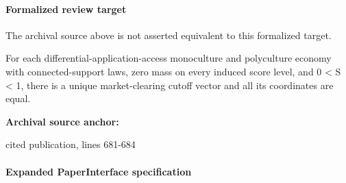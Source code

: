 \documentclass[10pt]{article}
\begin{document}
\paragraph{Formalized review target}
The archival source above is not asserted equivalent to this formalized target.
\begin{ReviewVerbatim}
For each differential-application-access monoculture and polyculture economy with connected-support laws, zero mass on every induced score level, and 0 < S < 1, there is a unique market-clearing cutoff vector and all its coordinates are equal.
\end{ReviewVerbatim}

\textbf{Archival source anchor:} {\footnotesize\raggedright cited publication, lines 681-\allowbreak{}684\par}
\paragraph{Expanded PaperInterface specification}
\end{document}
